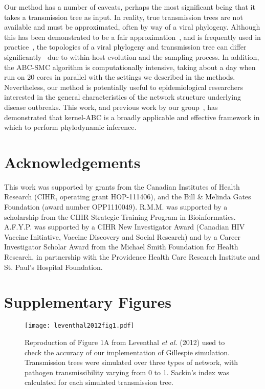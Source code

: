 \documentclass[12pt]{article}\usepackage[]{graphicx}\usepackage[]{color}
\begin{document}
Our method has a number of caveats, perhaps the most significant being that it
takes a transmission tree as input. In reality, true transmission trees are not
available and must be approximated, often by way of a viral phylogeny. Although
this has been demonstrated to be a fair
approximation~\autocite[e.g.][]{leitner1996accurate}, and is frequently used in
practice~\autocite[e.g.][]{stadler2013uncovering}, the topologies of a viral
phylogeny and transmission tree can differ
significantly~\autocite{ypma2013relating} due to within-host evolution and the
sampling process. In addition, the ABC-SMC algorithm is
computationally intensive, taking about a day when run on 20 cores in parallel
with the settings we described in the methods. Nevertheless, our method is
potentially useful to epidemiological researchers interested in the general
characteristics of the network structure underlying disease outbreaks. This
work, and previous work by our group~\autocite{poon2015phylodynamic}, has
demonstrated that kernel-ABC is a broadly applicable and effective framework in
which to perform phylodynamic inference.

\section{Acknowledgements}

This work was supported by grants from the Canadian Institutes of Health
Research (CIHR, operating grant HOP-111406), and the Bill \& Melinda Gates
Foundation (award number OPP1110049). R.M.M. was supported by a scholarship
from the CIHR Strategic Training Program in Bioinformatics. A.F.Y.P. was
supported by a CIHR New Investigator Award (Canadian HIV Vaccine Initiative,
Vaccine Discovery and Social Research) and by a Career Investigator Scholar
Award from the Michael Smith Foundation for Health Research, in partnership
with the Providence Health Care Research Institute and St. Paul's Hospital
Foundation.

\printbibliography

\newpage

\section*{Supplementary Figures}

\renewcommand{\thefigure}{S\arabic{figure}}
\setcounter{figure}{0}

\begin{figure}[ht]
  \centering
  \texttt{[image: leventhal2012fig1.pdf]}
  \caption{
    Reproduction of Figure 1A from Leventhal \textit{et al.} (2012) used to
    check the accuracy of our implementation of Gillespie simulation.
    Transmission trees were simulated over three types of network, with
    pathogen transmissibility varying from 0 to 1. Sackin's index was
    calculated for each simulated transmission tree.
  }
  \label{fig:leventhal}
\end{figure}
\end{document}
